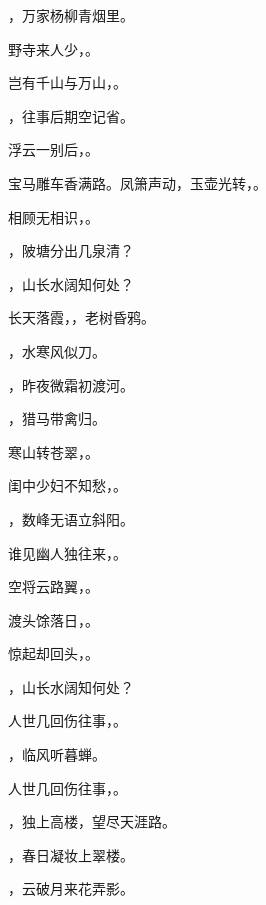 \documentclass[12pt, a4paper, addpoints]{exam}
\begin{document}
\begin{questions}
\question[1] \uline{\qquad\qquad\qquad}，万家杨柳青烟里。

\question[1] 野寺来人少，\uline{\qquad\qquad\qquad}。

\question[1] 岂有千山与万山，\uline{\qquad\qquad\qquad}。

\question[1] \uline{\qquad\qquad\qquad}，往事后期空记省。

\question[1] 浮云一别后，\uline{\qquad\qquad\qquad}。

\question[1] 宝马雕车香满路。凤箫声动，玉壶光转，\uline{\qquad\qquad\qquad}。

\question[1] 相顾无相识，\uline{\qquad\qquad\qquad}。

\question[1] \uline{\qquad\qquad\qquad}，陂塘分出几泉清？

\question[1] \uline{\qquad\qquad\qquad}，山长水阔知何处？

\question[1] 长天落霞，\uline{\qquad\qquad\qquad}，老树昏鸦。

\question[1] \uline{\qquad\qquad\qquad}，水寒风似刀。

\question[1] \uline{\qquad\qquad\qquad}，昨夜微霜初渡河。

\question[1] \uline{\qquad\qquad\qquad}，猎马带禽归。

\question[1] 寒山转苍翠，\uline{\qquad\qquad\qquad}。

\question[1] 闺中少妇不知愁，\uline{\qquad\qquad\qquad}。

\question[1] \uline{\qquad\qquad\qquad}，数峰无语立斜阳。

\question[1] 谁见幽人独往来，\uline{\qquad\qquad\qquad}。

\question[1] 空将云路翼，\uline{\qquad\qquad\qquad}。

\question[1] 渡头馀落日，\uline{\qquad\qquad\qquad}。

\question[1] 惊起却回头，\uline{\qquad\qquad\qquad}。

\question[1] \uline{\qquad\qquad\qquad}，山长水阔知何处？

\question[1] 人世几回伤往事，\uline{\qquad\qquad\qquad}。

\question[1] \uline{\qquad\qquad\qquad}，临风听暮蝉。

\question[1] 人世几回伤往事，\uline{\qquad\qquad\qquad}。

\question[1] \uline{\qquad\qquad\qquad}，独上高楼，望尽天涯路。

\question[1] \uline{\qquad\qquad\qquad}，春日凝妆上翠楼。

\question[1] \uline{\qquad\qquad\qquad}，云破月来花弄影。


\end{questions}
\end{document}
